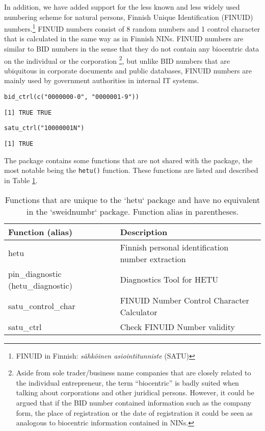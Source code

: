 In addition, we have added support for the less known and less widely used numbering scheme for natural persons, Finnish Unique Identification (FINUID) numbers.\footnote{FINUID in Finnish: \emph{sähköinen asiointitunniste} (SATU)} FINUID numbers consist of 8 random numbers and 1 control character that is calculated in the same way as in Finnish NINs. FINUID numbers are similar to BID numbers in the sense that they do not contain any biocentric data on the individual or the corporation \footnote{Aside from sole trader/business name companies that are closely related to the individual entrepreneur, the term ``biocentric'' is badly suited when talking about corporations and other juridical persons. However, it could be argued that if the BID number contained information such as the company form, the place of registration or the date of registration it could be seen as analogous to biocentric information contained in NINs.}, but unlike BID numbers that are ubiquitous in corporate documents and public databases, FINUID numbers are mainly used by government authorities in internal IT systems.

\begin{verbatim}
bid_ctrl(c("0000000-0", "0000001-9"))
\end{verbatim}

\begin{verbatim}
[1] TRUE TRUE
\end{verbatim}

\begin{verbatim}
satu_ctrl("10000001N")
\end{verbatim}

\begin{verbatim}
[1] TRUE
\end{verbatim}

The  package contains some functions that are not shared with the  package, the most notable being the \texttt{hetu()} function. These functions are listed and described in Table \ref{tab:hetu-function-table}.

\begin{table}[!h]
\centering
\caption{\label{tab:hetu-function-table}Functions that are unique to the `hetu` package and have no equivalent in the `sweidnumbr` package. Function alias in parentheses.}
\centering
\begin{tabular}[t]{ll}
\toprule
Function (alias) & Description\\
\midrule
hetu & Finnish personal identification number extraction\\
pin\_diagnostic (hetu\_diagnostic) & Diagnostics Tool for HETU\\
satu\_control\_char & FINUID Number Control Character Calculator\\
satu\_ctrl & Check FINUID Number validity\\
\bottomrule
\end{tabular}
\end{table}

